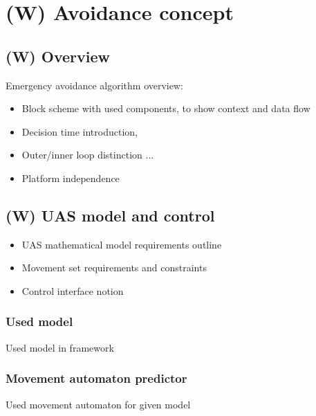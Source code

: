 \section{(W) Avoidance concept}\label{s:avoidanceConcept}
    
\subsection{(W) Overview}\label{s:avoidanceAlgorithmOverView}
    \noindent Emergency avoidance algorithm overview:
    \begin{itemize}
        \item Block scheme with used components, to show context and data flow
        \item Decision time introduction, 
        \item Outer/inner loop distinction ...
        \item Platform independence
    \end{itemize}

\subsection{(W) UAS model and control}\label{s:uasModelAndControl}
    \begin{itemize}
        \item UAS mathematical model requirements outline
        \item Movement set requirements and constraints
        \item Control interface notion
    \end{itemize}
    
    \subsubsection{Used model}
    \noindent Used model in framework
    
    \subsubsection{Movement automaton predictor}
    \noindent Used movement automaton for given model 

